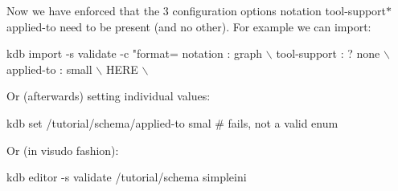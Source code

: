 Now we have enforced that the 3 configuration options {\ttfamily notation tool-\/support$\ast$ applied-\/to} need to be present (and no other). For example we can import\+:


\begin{DoxyCode}
kdb import -s validate -c "format=%
notation : graph                                                            \(\backslash\)
tool-support : ? none                                                       \(\backslash\)
applied-to : small                                                          \(\backslash\)
HERE                                                                        \(\backslash\)
\end{DoxyCode}


Or (afterwards) setting individual values\+:


\begin{DoxyCode}
kdb set /tutorial/schema/applied-to smal # fails, not a valid enum
\end{DoxyCode}


Or (in {\ttfamily visudo} fashion)\+:


\begin{DoxyCode}
kdb editor -s validate /tutorial/schema simpleini
\end{DoxyCode}
 